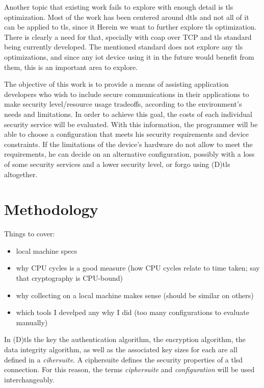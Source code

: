 \documentclass{llncs}
\begin{document}
Another topic that existing work fails to explore with enough detail is \gls{tls} optimization. 
Most of the work has been centered around \gls{dtls} and not all of it can be applied to \gls{tls},
since it 
Herein we want to further explore \gls{tls} optimization. There is clearly a need for that, 
specially with \gls{coap} over TCP and \gls{tls} standard being currently developed. The 
mentioned standard does not explore any \gls{tls} optimizations, and since any 
\gls{iot} device using it in the future would benefit from them, this is an important 
area to explore. 

The objective of this work is to provide a means of assisting application developers
who wish to include secure communications in their applications to make 
security level/resource usage tradeoffs, according to the environment's needs
and limitations. In order to achieve this goal, the costs of each individual security service
will be evaluated. With this information, the programmer will be able to choose a configuration that
meets his security requirements and device constraints. If the limitations of the device's hardware
do not allow to meet the requirements, he can decide on an alternative configuration, possibly with
a loss of some security services and a lower security level, or forgo using (D)\gls{tls} altogether.

\section{Methodology}

Things to cover:

\begin{itemize}
  \item local machine specs
  \item why CPU cycles is a good measure (how CPU cycles relate to time taken; say that cryptography is
    CPU-bound)
  \item why collecting on a local machine makes sense (should be similar on others)
  \item which tools I develped any why I did (too many configurations to evaluate manually)
\end{itemize}

In (D)\gls{tls} the key the authentication algorithm, the encryption algorithm, the
data integrity algorithm, as well as the associated key sizes for each are all defined in a \textit{cihersuite}.
A ciphersuite defines the security properties of a \acrshort{tlsd} connection. For this reason, the terms
\textit{ciphersuite} and \textit{configuration} will be used interchangeably.
\end{document}
